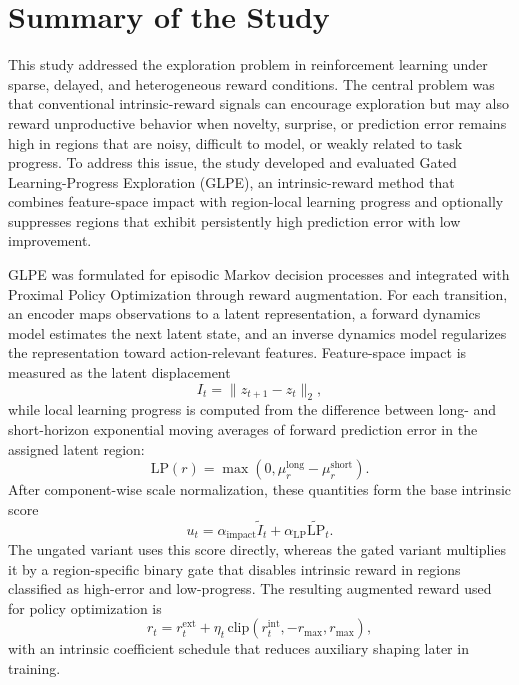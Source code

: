 \section{Summary of the Study}
\label{sec:conclusion_summary_of_the_study}

This study addressed the exploration problem in reinforcement learning under sparse, delayed, and heterogeneous reward conditions.
The central problem was that conventional intrinsic-reward signals can encourage exploration but may also reward unproductive behavior when novelty, surprise, or prediction error remains high in regions that are noisy, difficult to model, or weakly related to task progress.
To address this issue, the study developed and evaluated Gated Learning-Progress Exploration (GLPE), an intrinsic-reward method that combines feature-space impact with region-local learning progress and optionally suppresses regions that exhibit persistently high prediction error with low improvement.

GLPE was formulated for episodic Markov decision processes and integrated with Proximal Policy Optimization through reward augmentation.
For each transition, an encoder maps observations to a latent representation, a forward dynamics model estimates the next latent state, and an inverse dynamics model regularizes the representation toward action-relevant features.
Feature-space impact is measured as the latent displacement
\begin{equation}
    I_t = \lVert z_{t+1}-z_t\rVert_2,
\end{equation}
while local learning progress is computed from the difference between long- and short-horizon exponential moving averages of forward prediction error in the assigned latent region:
\begin{equation}
    \mathrm{LP}(r)=\max\!\left(0,\mu_r^{\mathrm{long}}-\mu_r^{\mathrm{short}}\right).
\end{equation}
After component-wise scale normalization, these quantities form the base intrinsic score
\begin{equation}
    u_t=\alpha_{\mathrm{impact}}\widetilde{I}_t+
    \alpha_{\mathrm{LP}}\widetilde{\mathrm{LP}}_t.
\end{equation}
The ungated variant uses this score directly, whereas the gated variant multiplies it by a region-specific binary gate that disables intrinsic reward in regions classified as high-error and low-progress.
The resulting augmented reward used for policy optimization is
\begin{equation}
    r_t=r_t^{\mathrm{ext}}+
    \eta_t\,\mathrm{clip}\!\left(r_t^{\mathrm{int}},-r_{\max},r_{\max}\right),
\end{equation}
with an intrinsic coefficient schedule that reduces auxiliary shaping later in training.

